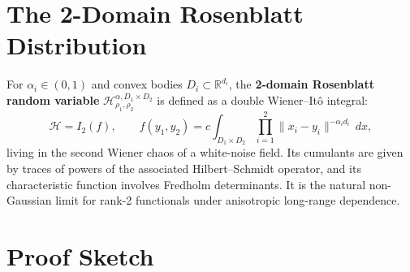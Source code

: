 \documentclass[11pt,a4paper]{article}
\begin{document}
\section{The 2-Domain Rosenblatt Distribution}

For $\alpha_i \in (0,1)$ and convex bodies $D_i \subset \mathbb{R}^{d_i}$, the \textbf{2-domain Rosenblatt random variable} $\mathcal{H}_{\rho_1,\rho_2}^{\alpha, D_1 \times D_2}$ is defined as a double Wiener--It\^o integral:
\[
\mathcal{H} = I_2(f), \qquad
f(y_1, y_2) = c \int_{D_1 \times D_2} \prod_{i=1}^{2} \|x_i - y_i\|^{-\alpha_i d_i}\,dx,
\]
living in the second Wiener chaos of a white-noise field.
Its cumulants are given by traces of powers of the associated Hilbert--Schmidt operator, and its characteristic function involves Fredholm determinants.
It is the natural non-Gaussian limit for rank-2 functionals under anisotropic long-range dependence.

\section{Proof Sketch}
\end{document}
